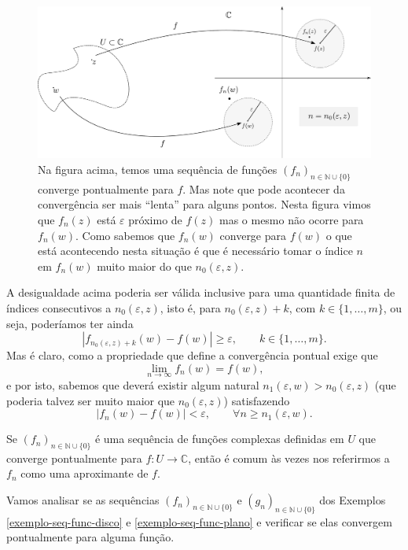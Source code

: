 \begin{figure}[h]
\centering
\includegraphics[width=0.95\linewidth]{Figuras/convergencia-pontual-redimensionado}
\caption{Na figura acima, temos uma sequência de funções 
$(f_n)_{n\in\mathbb{N}\cup\{0\}}$ converge pontualmente para $f$. 
Mas note que pode acontecer da convergência ser mais ``lenta'' para alguns pontos. Nesta
figura vimos que $f_n(z)$ está $\varepsilon$ próximo de $f(z)$ mas o mesmo não ocorre
para $f_n(w)$. Como sabemos que $f_n(w)$ converge para $f(w)$ o que está acontecendo
nesta situação é que é necessário tomar o índice $n$ em $f_n(w)$ muito maior do 
que $n_0(\varepsilon,z)$.}
\label{fig:convergencia-pontual-redimensionado}
\end{figure}


A desigualdade acima poderia ser válida inclusive para uma quantidade finita 
de índices consecutivos a $n_0(\varepsilon,z)$, isto é, para 
$n_0(\varepsilon,z)+k$, com $k\in\{1,\ldots,m\}$, ou seja, poderíamos ter ainda
\[
|f_{n_0(\varepsilon,z)+k}(w)-f(w)| \geqslant \varepsilon,
\qquad k\in\{1,\ldots,m\}. 
\] 
Mas é claro, como a propriedade que define a convergência pontual exige que
\[
\lim_{n\to\infty} f_n(w) = f(w),
\]
e por isto, sabemos que deverá existir algum natural $n_1(\varepsilon,w)>n_0(\varepsilon,z)$ (que poderia talvez ser muito maior que $n_0(\varepsilon,z)$) 
satisfazendo
\[
|f_{n}(w)-f(w)| < \varepsilon, \qquad \forall n\geqslant n_1(\varepsilon,w).
\]

Se $(f_n)_{n\in\mathbb{N}\cup\{0\}}$ é uma sequência de funções complexas definidas em
$U$ que converge pontualmente para $f:U\to\mathbb{C}$, então é comum às vezes 
nos referirmos a $f_n$ como uma aproximante de $f$.


\bigskip 
Vamos analisar se as sequências $(f_n)_{n\in\mathbb{N}\cup\{0\}}$ 
e $(g_n)_{n\in\mathbb{N}\cup\{0\}}$ dos Exemplos \ref{exemplo-seq-func-disco}
e \ref{exemplo-seq-func-plano} e verificar se elas convergem pontualmente para alguma função.


